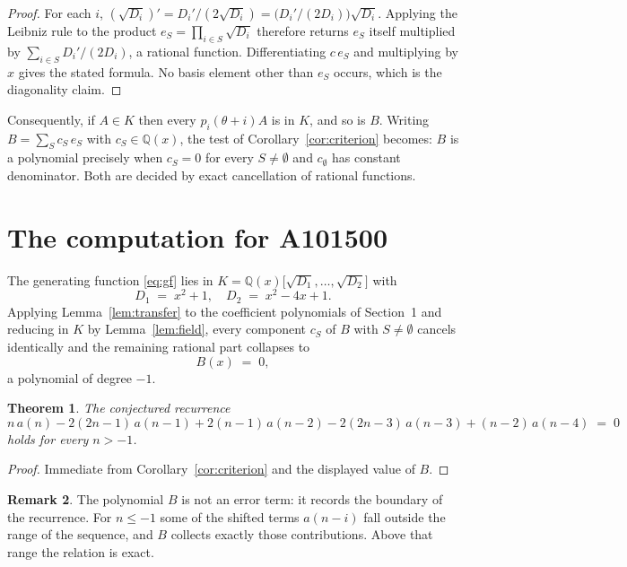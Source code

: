 \documentclass[11pt,a4paper]{article}
\theoremstyle{plain}
\newtheorem{theorem}{Theorem}
\theoremstyle{definition}
\newtheorem{remark}[theorem]{Remark}
\begin{document}
\begin{proof}
For each $i$, $(\sqrt{D_{i}})'=D_{i}'/(2\sqrt{D_{i}})=\bigl(D_{i}'/(2D_{i})\bigr)\sqrt{D_{i}}$.
Applying the Leibniz rule to the product $e_{S}=\prod_{i\in S}\sqrt{D_{i}}$ therefore
returns $e_{S}$ itself multiplied by $\sum_{i\in S}D_{i}'/(2D_{i})$, a rational function.
Differentiating $c\,e_{S}$ and multiplying by $x$ gives the stated formula. No basis
element other than $e_{S}$ occurs, which is the diagonality claim.
\end{proof}

Consequently, if $A\in K$ then every $p_{i}(\theta+i)A$ is in $K$, and so is $B$. Writing
$B=\sum_{S}c_{S}\,e_{S}$ with $c_{S}\in\mathbb{Q}(x)$, the test of
Corollary~\ref{cor:criterion} becomes: $B$ is a polynomial precisely when $c_{S}=0$ for
every $S\neq\emptyset$ and $c_{\emptyset}$ has constant denominator. Both are decided by
exact cancellation of rational functions.

\section{The computation for A101500}

The generating function \eqref{eq:gf} lies in $K=\mathbb{Q}(x)\bigl[\sqrt{D_{1}},\dots,\sqrt{D_{2}}\bigr]$ with
\[
D_{1} \;=\; x^{2} + 1,\quad D_{2} \;=\; x^{2} - 4 x + 1 .
\]
Applying Lemma~\ref{lem:transfer} to the coefficient polynomials of Section~1 and reducing
in $K$ by Lemma~\ref{lem:field}, every component $c_{S}$ of $B$ with $S\neq\emptyset$
cancels identically and the remaining rational part collapses to
\[
B(x)\;=\;0 ,
\]
a polynomial of degree $-1$.

\begin{theorem}
The conjectured recurrence
\[
n\,a(n) -  2 \left(2 n - 1\right)\,a(n-1) + 2 \left(n - 1\right)\,a(n-2) -  2 \left(2 n - 3\right)\,a(n-3) + (n - 2)\,a(n-4) \;=\;0
\]
holds for every $n>-1$.
\end{theorem}

\begin{proof}
Immediate from Corollary~\ref{cor:criterion} and the displayed value of $B$.
\end{proof}

\begin{remark}
The polynomial $B$ is not an error term: it records the boundary of the recurrence. For
$n\le-1$ some of the shifted terms $a(n-i)$ fall outside the range of the sequence,
and $B$ collects exactly those contributions. Above that range the relation is exact.
\end{remark}
\end{document}
